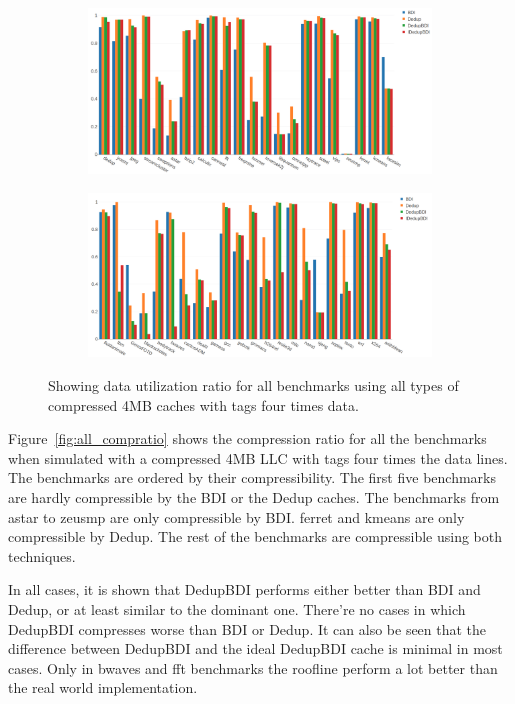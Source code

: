 \begin{figure}
    \begin{subfigure}{\textwidth}
        \includegraphics[width=\textwidth]{all-datautil1.png}
    \end{subfigure}
    \begin{subfigure}{\textwidth}
        \includegraphics[width=\textwidth]{all-datautil2.png}
    \end{subfigure}
    \caption[All benchmarks: Data Utilization]{Showing data utilization ratio for all benchmarks using all types of compressed 4MB caches with tags four times data.}
    \label{fig:all_datautil}
\end{figure}
Figure~\ref{fig:all_compratio} shows the compression ratio for all the benchmarks when simulated with a compressed 4MB LLC with tags four times the data lines. The benchmarks are ordered by their compressibility. The first five benchmarks are hardly compressible by the BDI or the Dedup caches. The benchmarks from astar to zeusmp are only compressible by BDI. ferret and kmeans are only compressible by Dedup. The rest of the benchmarks are compressible using both techniques.\par
In all cases, it is shown that DedupBDI performs either better than BDI and Dedup, or at least similar to the dominant one. There're no cases in which DedupBDI compresses worse than BDI or Dedup. It can also be seen that the difference between DedupBDI and the ideal DedupBDI cache is minimal in most cases. Only in bwaves and fft benchmarks the roofline perform a lot better than the real world implementation.\par
